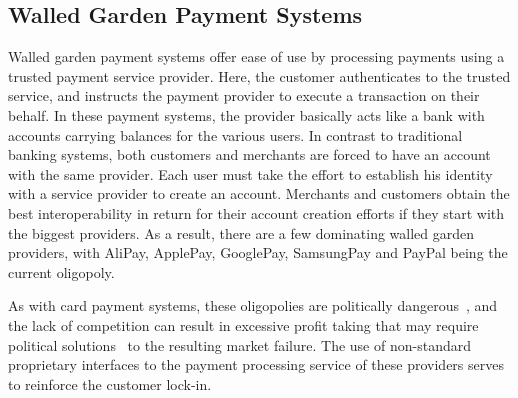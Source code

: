 

\subsection{Walled Garden Payment Systems}

Walled garden payment systems offer ease of use by processing payments using a
trusted payment service provider. Here, the customer authenticates to the
trusted service, and instructs the payment provider to execute a transaction on
their behalf.  In these payment systems, the provider basically acts like a
bank with accounts carrying balances for the various users.  In contrast to
traditional banking systems, both customers and merchants are forced to have an
account with the same provider.  Each user must take the effort to establish
his identity with a service provider to create an account.  Merchants and
customers obtain the best interoperability in return for their account creation
efforts if they start with the biggest providers.  As a result, there are a few
dominating walled garden providers, with AliPay, ApplePay, GooglePay,
SamsungPay and PayPal being the current oligopoly.

As with card payment systems, these oligopolies are politically
dangerous~\cite{crinkey2011rundle}, and the lack of competition
can result in excessive profit taking that may require political
solutions~\cite{guardian2015cap} to the resulting market
  failure.  The use of non-standard proprietary interfaces to
the payment processing service of these providers serves to reinforce
the customer lock-in.



